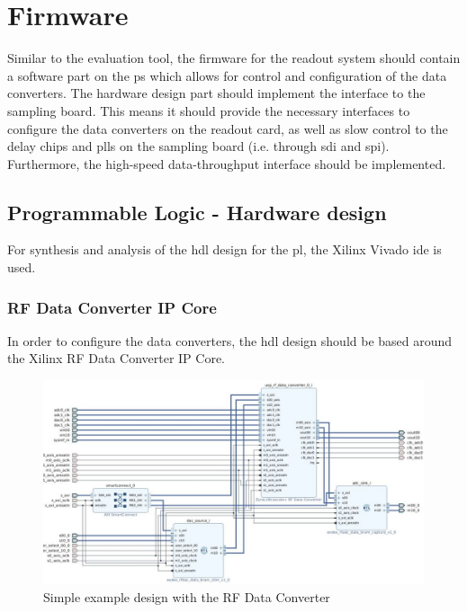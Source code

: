 \section{Firmware}\label{sec:firmware}
Similar to the evaluation tool, the firmware for the readout system should contain a software part on the \gls{ps} which allows for control and configuration of the data converters. 
The hardware design part should implement the interface to the sampling board. 
This means it should provide the necessary interfaces to configure the data converters on the readout card, as well as slow control to the delay chips and \glspl{pll} on the sampling board (i.e. through \gls{sdi} and \gls{spi}). 
Furthermore, the high-speed data-throughput interface should be implemented.
\subsection{Programmable Logic - Hardware design}
For synthesis and analysis of the \gls{hdl} design for the \gls{pl}, the Xilinx Vivado \gls{ide} is used.

\subsubsection*{RF Data Converter IP Core}
In order to configure the data converters, the \gls{hdl} design should be based around the Xilinx RF Data Converter IP Core. 

\begin{figure}[tbh]
	\centering
	\includegraphics[width = \textwidth]{chap/04-work/img/rf_data_converter}
	\caption{Simple example design with the RF Data Converter}
	\label{fig:rf_dc_ex}
\end{figure}

